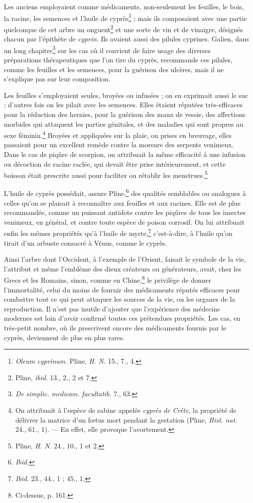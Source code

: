 \documentclass{article}
\begin{document}
Les anciens employaient comme médicaments, non-seulement les feuilles, le bois, la racine, les semences et l'huile de cyprès\footnote{\emph{Oleum cyprinum.} Pline, \emph{H. N.} 15., 7., 4.} ; mais ils composaient avec une partie quelconque de cet arbre un onguent\footnote{Pline, \emph{ibid.} 13., 2., 2 et 7.} et une sorte de vin et de vinaigre, désignés chacun par l'épithète de \emph{cyprin}. Ils avaient aussi des pilules cyprines. Galien, dans un long chapitre\footnote{\emph{De simplic. medicam. facultatib.} 7., 63.} sur les cas où il convient de faire usage des diverses préparations thérapeutiques que l'on tire du cyprès, recommande ces pilules, comme les feuilles et les semences, pour la guérison des ulcères, mais il ne s'explique pas sur leur composition.

Les feuilles s'employaient seules, broyées ou infusées ; on en exprimait aussi le suc ; d'autres fois on les pilait avec les semences. Elles étaient réputées très-efficaces pour la réduction des hernies, pour la guérison des maux de vessie, des affections morbides qui attaquent les parties génitales, et des maladies qui sont propres au sexe féminin.\footnote{On attribuait à l'espèce de sabine appelée \emph{cyprès de Crète}, la propriété de délivrer la matrice d'un fœtus mort pendant la gestation (Pline, \emph{Hist. nat.} 24., 61., 1). --- En effet, elle provoque l'avortement.} Broyées et appliquées sur la plaie, ou prises en breuvage, elles passaient pour un excellent remède contre la morsure des serpents venimeux. Dans le cas de piqûre de scorpion, on attribuait la même efficacité à une infusion ou décoction de racine raclée, qui devait être prise intérieurement, et cette boisson était prescrite aussi pour faciliter ou rétablir les menstrues.\footnote{Pline, \emph{H. N.} 24., 10., 1 et 2.}

L'huile de cyprès possédait, assure Pline,\footnote{\emph{Ibid.}} des qualités semblables ou analogues à celles qu'on se plaisait à reconnaître aux feuilles et aux racines. Elle est de plus recommandée, comme un puissant antidote contre les piqûres de tous les insectes venimeux, en général, et contre toute espèce de poison corrosif. On lui attribuait enfin les mêmes propriétés qu'à l'huile de myrte,\footnote{\emph{Ibid.} 23., 44., 1 ; 45., 1.} c'est-à-dire, à l'huile qu'on tirait d'un arbuste consacré à Vénus, comme le cyprès.

Ainsi l'arbre dont l'Occident, à l'exemple de l'Orient, faisait le symbole de la vie, l'attribut et même l'emblème des dieux créateurs ou générateurs, avait, chez les Grecs et les Romains, sinon, comme en Chine,\footnote{Ci-dessus, p. 161.} le privilège de donner l'immortalité, celui du moins de fournir des médicaments réputés efficaces pour combattre tout ce qui peut attaquer les sources de la vie, ou les organes de la reproduction. Il n'est pas inutile d'ajouter que l'expérience des médecins modernes est loin d'avoir confirmé toutes ces prétendues propriétés. Les cas, en très-petit nombre, où ils prescrivent encore des médicaments fournis par le cyprès, deviennent de plus en plus rares.
\end{document}
